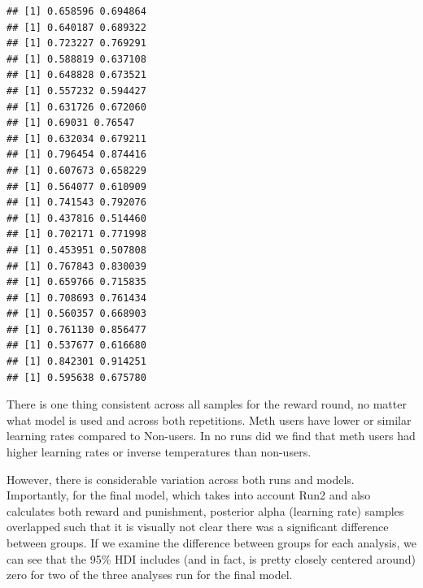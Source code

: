 \documentclass[]{article}
\begin{document}
\begin{verbatim}
## [1] 0.658596 0.694864
## [1] 0.640187 0.689322
## [1] 0.723227 0.769291
## [1] 0.588819 0.637108
## [1] 0.648828 0.673521
## [1] 0.557232 0.594427
## [1] 0.631726 0.672060
## [1] 0.69031 0.76547
## [1] 0.632034 0.679211
## [1] 0.796454 0.874416
## [1] 0.607673 0.658229
## [1] 0.564077 0.610909
## [1] 0.741543 0.792076
## [1] 0.437816 0.514460
## [1] 0.702171 0.771998
## [1] 0.453951 0.507808
## [1] 0.767843 0.830039
## [1] 0.659766 0.715835
## [1] 0.708693 0.761434
## [1] 0.560357 0.668903
## [1] 0.761130 0.856477
## [1] 0.537677 0.616680
## [1] 0.842301 0.914251
## [1] 0.595638 0.675780
\end{verbatim}

There is one thing consistent across all samples for the reward round,
no matter what model is used and across both repetitions. Meth users
have lower or similar learning rates compared to Non-users. In no runs
did we find that meth users had higher learning rates or inverse
temperatures than non-users.

However, there is considerable variation across both runs and models.
Importantly, for the final model, which takes into account Run2 and also
calculates both reward and punishment, posterior alpha (learning rate)
samples overlapped such that it is visually not clear there was a
significant difference between groups. If we examine the difference
between groups for each analysis, we can see that the 95\% HDI includes
(and in fact, is pretty closely centered around) zero for two of the
three analyses run for the final model.
\end{document}
